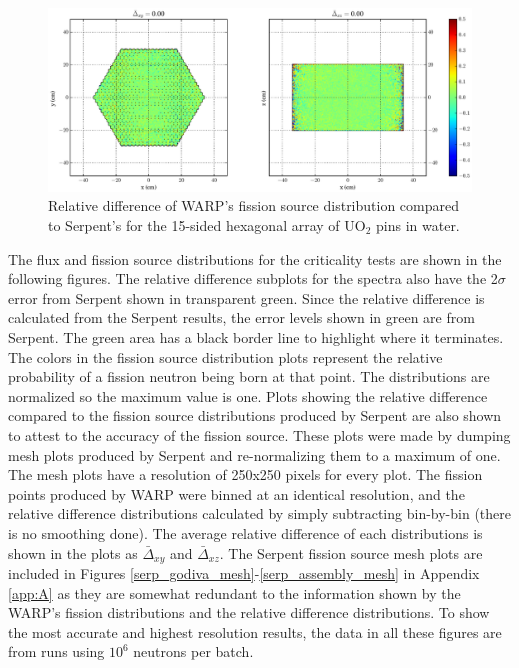 \begin{figure}[h!]
\centering
\includegraphics[width=\textwidth,trim= 4cm 0cm 6cm 0cm]{graphics/finalresults/assembly_fiss_diff-6.eps}
\caption{Relative difference of WARP's fission source distribution compared to Serpent's for the 15-sided hexagonal array of UO$_2$ pins in water. \label{assembly_fiss_diff} }
\end{figure}


The flux and fission source distributions for the criticality tests are shown in the following figures.  The relative difference subplots for the spectra also have the 2$\sigma$ error from Serpent shown in transparent green.  Since the relative difference is calculated from the Serpent results, the error levels shown in green are from Serpent.  The green area has a black border line to highlight where it terminates.  The colors in the fission source distribution plots represent the relative probability of a fission neutron being born at that point.  The distributions are normalized so the maximum value is one.  Plots showing the relative difference compared to the fission source distributions produced by Serpent are also shown to attest to the accuracy of the fission source.  These plots were made by dumping mesh plots produced by Serpent and re-normalizing them to a maximum of one.  The mesh plots have a resolution of 250x250 pixels for every plot.  The fission points produced by WARP were binned at an identical resolution, and the relative difference distributions calculated by simply subtracting bin-by-bin (there is no smoothing done).  The average relative difference of each distributions is shown in the plots as $\bar{\Delta}_{xy}$ and $\bar{\Delta}_{xz}$.  The Serpent fission source mesh plots are included in Figures \ref{serp_godiva_mesh}-\ref{serp_assembly_mesh} in Appendix \ref{app:A} as they are somewhat redundant to the information shown by the WARP's fission distributions and the relative difference distributions.  To show the most accurate and highest resolution results, the data in all these figures are from runs using $10^6$ neutrons per batch.




